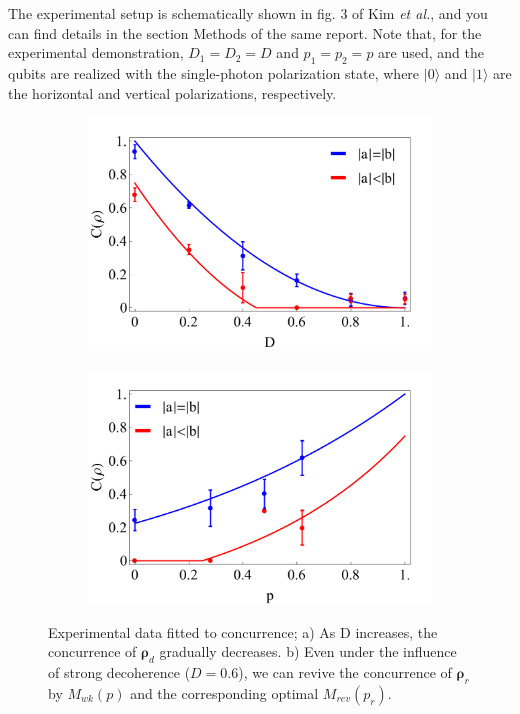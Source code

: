 \documentclass[%
 reprint,
 amsmath,amssymb,
 aps,
]{revtex4-1}
\begin{document}
The experimental setup is schematically shown in fig. 3 of Kim \textit{et al.}, and you can find details in the section Methods of the same report. Note that, for the experimental demonstration, $D_1=D_2=D$ and $p_1=p_2=p$ are used, and the qubits are realized with the single-photon polarization state, where $|0\rangle$ and $|1\rangle$ are the horizontal and vertical polarizations, respectively.

\begin{figure}
        \centering
        \begin{subfigure}[b]{0.49\textwidth}
                \includegraphics[width=\textwidth]{concd}
                \caption{}
                \label{fig:concd}
        \end{subfigure}
        \vfill
        \begin{subfigure}[b]{0.49\textwidth}
                \includegraphics[width=\textwidth]{concw}
                \caption{}
                \label{fig:concw}
        \end{subfigure}
        \caption{Experimental data fitted to concurrence; a) As D increases, the concurrence of $\boldsymbol{\rho}_d$ gradually decreases. b) Even under the influence of strong decoherence ($D=0.6$), we can revive the concurrence of $\boldsymbol{\rho}_r$ by $M_{wk}(p)$ and the corresponding optimal $M_{rev}(p_r)$.}\label{fig:conc}
\end{figure}
\end{document}
